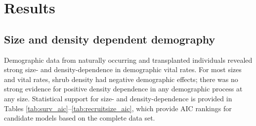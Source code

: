\documentclass[11pt]{article}\usepackage[]{graphicx}\usepackage[usenames,dvipsnames]{xcolor}
\begin{document}
\section*{Results}

\subsection*{Size and density dependent demography}
Demographic data from naturally occurring and transplanted individuals revealed strong size- and density-dependence in demographic vital rates. 
For most sizes and vital rates, shrub density had negative demographic effects; there was no strong evidence for positive density dependence in any demographic process at any size. 
Statistical support for size- and density-dependence is provided in Tables \ref{tab:surv_aic}--\ref{tab:recruitsize_aic}, which provide AIC rankings for candidate models based on the complete data set. 
\end{document}
